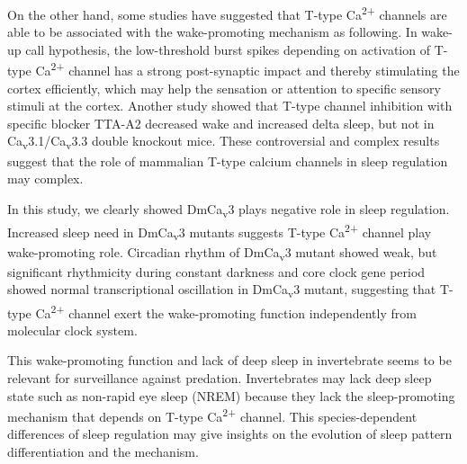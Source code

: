 On the other hand, some studies have suggested that T-type Ca\textsuperscript{2+} channels are able to be associated with the wake-promoting mechanism as following.
In wake-up call hypothesis, the low-threshold burst spikes depending on activation of T-type Ca\textsuperscript{2+} channel has a strong post-synaptic impact and thereby stimulating the cortex efficiently\cite{swadlow:2001aa}, which may help the sensation or attention to specific sensory stimuli at the cortex.
Another study showed that T-type channel inhibition with specific blocker TTA-A2 decreased wake and increased delta sleep, but not in Ca\textsubscript{v}3.1/Ca\textsubscript{v}3.3 double knockout mice\cite{kraus:2010aa}.
These controversial and complex results suggest that the role of mammalian T-type calcium channels in sleep regulation may complex. 

In this study, we clearly showed DmCa\textsubscript{v}3 plays negative role in sleep regulation.
Increased sleep need in DmCa\textsubscript{v}3 mutants suggests T-type Ca\textsuperscript{2+} channel play wake-promoting role.
Circadian rhythm of DmCa\textsubscript{v}3 mutant showed weak, but significant rhythmicity during constant darkness and core clock gene period showed normal transcriptional oscillation in DmCa\textsubscript{v}3 mutant, suggesting that T-type Ca\textsuperscript{2+} channel exert the wake-promoting function independently from molecular clock system.

This wake-promoting function and lack of deep sleep in invertebrate seems to be relevant for surveillance against predation.
Invertebrates may lack deep sleep state such as non-rapid eye sleep (NREM) because they lack the sleep-promoting mechanism that depends on T-type Ca\textsuperscript{2+} channel.
This species-dependent differences of sleep regulation may give insights on the evolution of sleep pattern differentiation and the mechanism.
  
  
  
  
  
  
  
  